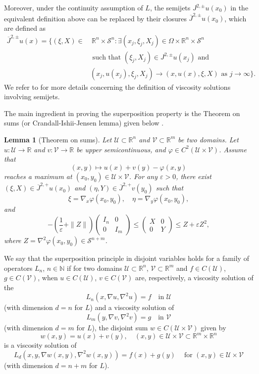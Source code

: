 \documentclass[12pt, reqno]{amsart}
\newtheorem{lemma}[theorem]{Lemma}
\newcommand{\R}{\mathbb{R}}
\def\Om{\Omega}
\def\R{{\mathbb R}}
\def\S{{\mathcal S}}
\def\U{{\mathcal U}}
\def\V{{\mathcal V}}
\begin{document}
Moreover, under the continuity assumption of $L$, the semijets $J^{2, \pm}u(x_0)$ in the equivalent definition above can be replaced by their closures $\overline{J}^{2, \pm}u(x_0)$, which are defined as
\[
\begin{aligned}
    \overline{J}^{2, \pm}u(x)= \bigg\{(\xi, X)\in & \ \R^{n}\times \S^n: \exists (x_j, \xi_j, X_j)\in \Om\times  \R^{n}\times \S^n\\
    & \text{ such that } (\xi_j, X_j)\in J^{2, \pm} u(x_j) \text{ and }\\
    & (x_j, u(x_j), \xi_j, X_j)\to (x, u(x), \xi, X)\text{ as $j\to \infty$}\bigg\}. 
\end{aligned}
\]
We refer to \cite{CIL} for more details concerning the definition of viscosity solutions involving semijets. 
    
The main ingredient in proving the superposition property is the Theorem on sums (or Crandall-Ishii-Jensen lemma) given below \cite[Theorem 3.2]{CIL}. 

\begin{lemma}[Theorem on sums]\label{TOS}
Let $\U\subset \R^n$ and $\V\subset \R^m$ be two domains. Let $u:\U\to \R$ and $v:\V \to \R$ be upper semicontinuous, and $\varphi\in C^2(\U\times \V)$. Assume that \[ (x, y)\mapsto u(x)+v(y)-\varphi(x,y) \] reaches a maximum at $(x_0,y_0)\in \U\times \V$. For any $\varepsilon>0$, there exist $(\xi, X)\in \overline{J}^{2,+}u(x_0)$ and $(\eta, Y)\in \overline{J}^{2,+}v(y_0)$ such that
\[
\xi=\nabla_x \varphi(x_0,y_0),\quad\eta=\nabla_y \varphi(x_0,y_0),    
\]
and
\[
-\left(\frac{1}{\varepsilon}+\|Z\|\right)\begin{pmatrix}
I_n & 0 \\
0 & I_m 
\end{pmatrix}\le \begin{pmatrix}
X & 0 \\
0 & Y
\end{pmatrix}\le Z+\varepsilon Z^2,
\]
where $Z=\nabla^2 \varphi(x_0, y_0)\in \S^{n+m}$. 
\end{lemma}


We say that the superposition principle in disjoint variables holds for a family of operators $L_n$, $n\in\mathbb{N}$ if for two domains $\U\subset \R^{n}$, $\V\subset \R^m$ and $f\in C(\U)$, $g\in C(\V)$, when $u\in C(\U)$, $v\in C(\V)$ are, respectively, a viscosity solution of the 
\[
L_n(x, \nabla u, \nabla^2 u)=f \quad \text{in $\U$}
\]
(with dimension $d=n$ for $L$) and a viscosity solution of 
\[
L_m(y, \nabla v, \nabla^2 v)=g \quad \text{in $\V$}
\]
(with dimension $d=m$ for $L$), the disjoint sum $w\in C(\U\times \V)$ given by  
\[
w(x, y)=u(x)+v(y), \quad (x, y)\in \U\times \V\subset \R^m\times \R^n
\]
is a viscosity solution of 
\[
L_d(x, y, \nabla w(x, y), \nabla^2 w(x, y))=f(x)+g(y) \ \quad \text{for $(x, y)\in \U\times \V$}
\]
(with dimension $d=n+m$ for $L$). 
\end{document}
